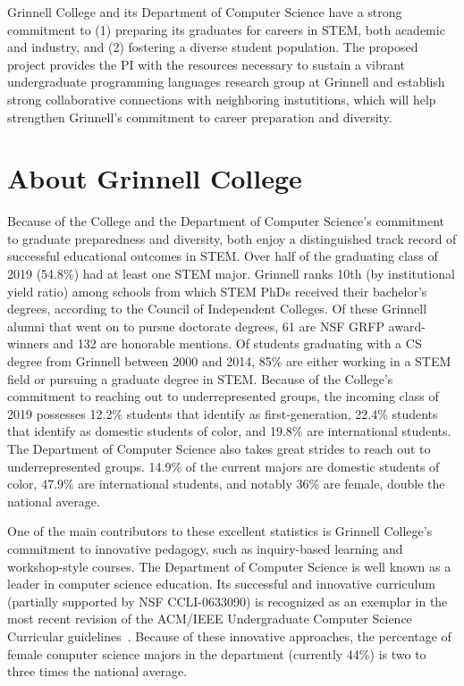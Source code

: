 \documentclass[11pt]{article}
\begin{document}
\smalltitle{}

Grinnell College and its Department of Computer Science have a strong commitment to (1) preparing its graduates for careers in STEM, both academic and industry, and (2) fostering a diverse student population.
The proposed project provides the PI with the resources necessary to sustain a vibrant undergraduate programming languages research group at Grinnell and establish strong collaborative connections with neighboring instutitions, which will help strengthen Grinnell's commitment to career preparation and diversity.
\vspace{2ex}
\section{About Grinnell College}

Because of the College and the Department of Computer Science's commitment to graduate preparedness and diversity, both enjoy a distinguished track record of successful educational outcomes in STEM.
Over half of the graduating class of 2019 (54.8\%) had at least one STEM major.
Grinnell ranks 10th (by institutional yield ratio) among schools from which STEM PhDs received their bachelor's degrees, according to the Council of Independent Colleges.
Of these Grinnell alumni that went on to pursue doctorate degrees, 61 are NSF GRFP award-winners and 132 are honorable mentions.
Of students graduating with a CS degree from Grinnell between 2000 and 2014, 85\% are either working in a STEM field or pursuing a graduate degree in STEM.
Because of the College's commitment to reaching out to underrepresented groups, the incoming class of 2019 possesses 12.2\% students that identify as first-generation, 22.4\% students that identify as domestic students of color, and 19.8\% are international students.
The Department of Computer Science also takes great strides to reach out to underrepresented groups.
14.9\% of the current majors are domestic students of color, 47.9\% are international students, and notably 36\% are female, double the national average.

One of the main contributors to these excellent statistics is Grinnell College's commitment to innovative pedagogy, such as inquiry-based learning and workshop-style courses.
The Department of Computer Science is well known as a leader in computer science education.
Its successful and innovative curriculum~\cite{cowden:sigcse:2012, rebelsky:sigcse:2013} (partially supported by NSF CCLI-0633090) is recognized as an exemplar in the most recent revision of the ACM/IEEE Undergraduate Computer Science Curricular guidelines~\cite{acm:curriculum:2013}.
Because of these innovative approaches, the percentage of female computer science majors in the department (currently 44\%) is two to three times the national average.
\end{document}
